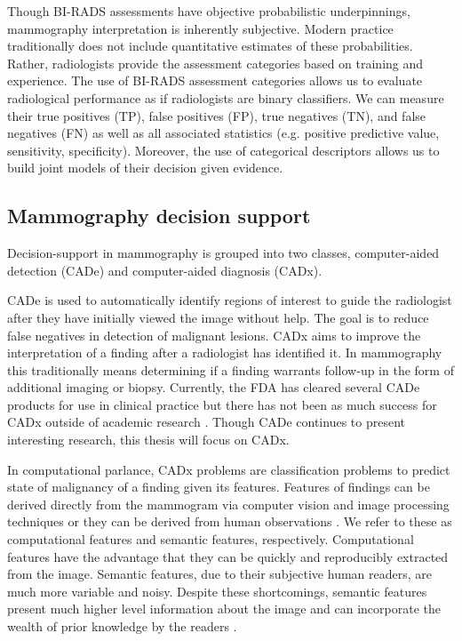 Though BI-RADS assessments have objective probabilistic underpinnings, mammography interpretation is inherently subjective. Modern practice traditionally does not include quantitative estimates of these probabilities. Rather, radiologists provide the assessment categories based on training and experience. The use of BI-RADS assessment categories allows us to evaluate radiological performance as if radiologists are binary classifiers. We can measure their true positives (TP), false positives (FP), true negatives (TN), and false negatives (FN) as well as all associated statistics (e.g. positive predictive value, sensitivity, specificity). Moreover, the use of categorical descriptors allows us to build joint models of their decision given evidence.

\subsection{Mammography decision support}
Decision-support in mammography is grouped into two classes, computer-aided detection (CADe) and computer-aided diagnosis (CADx). 

CADe is used to automatically identify regions of interest to guide the radiologist after they have initially viewed the image without help. The goal is to reduce false negatives in detection of malignant lesions. CADx aims to improve the interpretation of a finding after a radiologist has identified it. In mammography this traditionally means determining if a finding warrants follow-up in the form of additional imaging or biopsy. Currently, the FDA has cleared several CADe products for use in clinical practice but there has not been as much success for CADx outside of academic research \cite{Castellino:2005ke, Oliver:2010fm, Fujita:2008it}. Though CADe continues to present interesting research, this thesis will focus on CADx.

In computational parlance, CADx problems are classification problems to predict state of malignancy of a finding given its features. Features of findings can be derived directly from the mammogram via computer vision and image processing techniques \cite{Jiang:1999fj,Jiang:2001fy, Giger:2013jb, Eadie:2011cv} or they can be derived from human observations \cite{ElizabethS:2005gc, Burnside:2000wl, Rubin:2005jg}. We refer to these as computational features and semantic features, respectively. Computational features have the advantage that they can be quickly and reproducibly extracted from the image. Semantic features, due to their subjective human readers, are much more variable and noisy. Despite these shortcomings, semantic features present much higher level information about the image and can incorporate the wealth of prior knowledge by the readers \cite{Liberman:ws,Elter:2009fv}.

